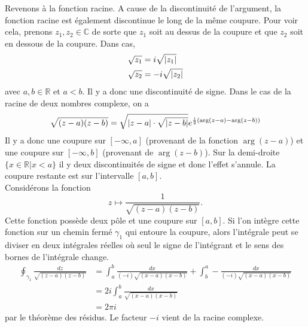 \documentclass[a4paper,11pt]{report}
\begin{document}
            
            Revenons à la fonction racine. A cause de la discontinuité de l'argument, la fonction racine est également discontinue le long de la même coupure. Pour voir cela, prenons $z_1,z_2\in\mathbb{C}$ de sorte que $z_1$ soit au dessus de la coupure et que $z_2$ soit en dessous de la coupure. Dans cas,
            \begin{align}
                \sqrt{z_1} &= i\sqrt{\abs{z_1}}\\
                \sqrt{z_2} &= -i\sqrt{\abs{z_2}}
            \end{align}
            avec $a,b\in\mathbb{R}$ et $a<b$. Il y a donc une discontinuité de signe. Dans le cas de la racine de deux nombres complexe, on a 
            \begin{equation}
                \sqrt{(z-a)(z-b)} = \sqrt{\abs{z-a}\cdot\sqrt{\abs{z-b}}}e^{\frac{i}{2}\left( \arg(z-a)-\arg(z-b) \right)}
            \end{equation}
            Il y a donc une coupure sur $[-\infty,a]$ (provenant de la fonction $\arg(z-a)$) et une coupure sur $[-\infty,b]$ (provenant de $\arg(z-b)$). Sur la demi-droite $\{x\in\mathbb{R}|x<a\}$ il y deux discontinuités de signe et donc l'effet s'annule. La coupure restante est sur l'intervalle $[a,b]$.\\
            
            Considérons la fonction
            \begin{equation*}
                z\mapsto \frac{1}{\sqrt{\left( z-a \right)\left( z-b \right)}}.
            \end{equation*}
            Cette fonction possède deux pôle et une coupure sur $[a,b]$. Si l'on intègre cette fonction sur un chemin fermé $\gamma_1$ qui entoure la coupure, alors l'intégrale peut se diviser en deux intégrales réelles où seul le signe de l'intégrant et le sens des bornes de l'intégrale change.
            \begin{align}
                \oint_{\gamma_1}\frac{dz}{\sqrt{\left( z-a \right)\left( z-b \right)}} &= \int_a^b \frac{dx}{(-i)\sqrt{\left( x-a \right)\left( x-b \right)}}+\int_b^a -\frac{dx}{(-i)\sqrt{\left( x-a \right)\left( x-b \right)}}\\
                &= 2i\int_a^b \frac{dx}{\sqrt{\left( x-a \right)\left( x-b \right)}}\\
                &= 2\pi i
            \end{align}
            par le théorème des résidus. Le facteur $-i$ vient de la racine complexe.\\
            
\end{document}
